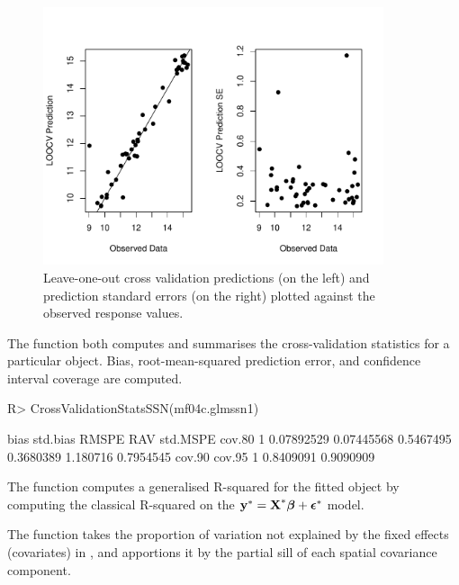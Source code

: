 \documentclass[nojss]{jss}
\renewenvironment{Schunk}{\vspace{\topsep}}{\vspace{\topsep}}
\def\bbeta{\mbox{\boldmath $\beta$}}
\def\bepsilon{\mbox{\boldmath $\epsilon$}}
\def\by{\textbf{y}}
\def\bX{\textbf{X}}
\begin{document}
\begin{figure}[htbp]
  \begin{center}
    \includegraphics[keepaspectratio=true, width = 100mm]{Figures/jss984Fig-LOOCV}
    \caption{Leave-one-out cross validation predictions (on the left) and prediction
      standard errors (on the right) plotted against the observed response
      values.\label{LOOCV}}
  \end{center}
\end{figure}

The function  both computes and
summarises the cross-validation statistics for a particular
 object. Bias, root-mean-squared prediction error, and
confidence interval coverage are computed.

\begin{Schunk}
\begin{Sinput}
R> CrossValidationStatsSSN(mf04c.glmssn1)
\end{Sinput}
\begin{Soutput}
        bias   std.bias     RMSPE       RAV std.MSPE    cov.80
1 0.07892529 0.07445568 0.5467495 0.3680389 1.180716 0.7954545
     cov.90    cov.95
1 0.8409091 0.9090909
\end{Soutput}
\end{Schunk}

The  function computes a generalised R-squared for the
fitted  object by computing the classical R-squared on
the $\by^* = \bX^*\bbeta + \bepsilon^*$ model.

The  function takes the proportion of variation not
explained by the fixed effects (covariates) in , and
apportions it by the partial sill of each spatial covariance
component.
\end{document}
